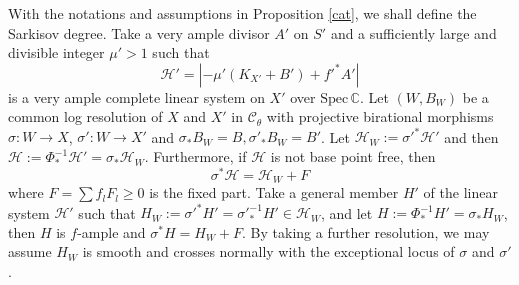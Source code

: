 \documentclass[11pt]{amsart}
\begin{document}
With the notations and assumptions in Proposition \ref{cat},   we shall define the Sarkisov degree. Take a  very ample divisor $ A'  $ on $ S' $ and a sufficiently large and divisible integer $ \mu'>1 $ such that
\[ \mathcal{H}'=|-\mu' (K_{X'}+B') +f'^*A'| \]
is a very ample complete linear system on $ X' $ over $ \mathrm{Spec}\,\mathbb{C} $. Let $ (W,B_W) $ be a common log resolution of $ X $ and $ X' $ in $ \mathcal{C}_\theta $ with projective birational morphisms $ \sigma:W\to X$,   $\sigma':W\to X' $ and $\sigma_*B_W=B, \sigma'_*B_W=B' $. Let $\mathcal{H}_W:=\sigma'^*\mathcal{H}'$
and then  $\mathcal{H}:=\Phi^{-1}_*\mathcal{H}'=\sigma_*\mathcal{H}_W$. Furthermore, if $ \mathcal{H} $ is not base point free, then
\[ \sigma^*\mathcal{H}=\mathcal{H}_W+F \]
where $ F=\sum f_lF_l\geqslant0 $ is the fixed part. Take a general member $ H' $ of the linear system $ \mathcal{H}' $ such that $ H_W:=\sigma'^*H'=\sigma'^{-1}_*H'\in \mathcal{H}_W $, and let $ H:=\Phi^{-1}_*H'=\sigma_*H_{W} $, then $H$ is $f$-ample and $ \sigma^*H=H_W+F $. By taking a further resolution, we may assume $H_{W}$ is smooth and crosses normally with the exceptional locus of $\sigma$ and $\sigma'$.
\end{document}
